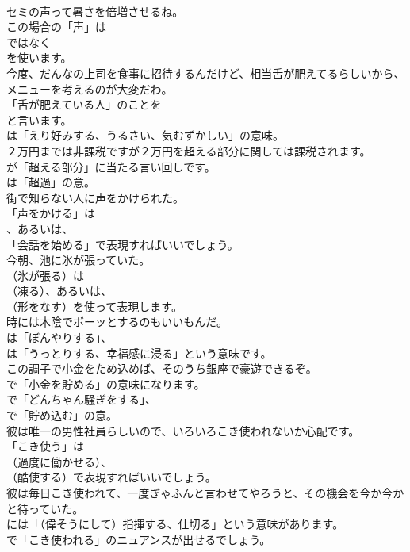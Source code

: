 \documentclass[8pt]{extreport}
\begin{document}
\begin{CJK}{UTF8}{min}
\\	セミの声って暑さを倍増させるね。 
\\	この場合の「声」は
\\	ではなく
\\	を使います。	
\\	今度、だんなの上司を食事に招待するんだけど、相当舌が肥えてるらしいから、メニューを考えるのが大変だわ。 
\\	「舌が肥えている人」のことを
\\	と言います。
\\	は「えり好みする、うるさい、気むずかしい」の意味。	
\\	２万円までは非課税ですが２万円を超える部分に関しては課税されます。 
\\	が「超える部分」に当たる言い回しです。
\\	は「超過」の意。	
\\	街で知らない人に声をかけられた。 
\\	「声をかける」は
\\	、あるいは、
\\	「会話を始める」で表現すればいいでしょう。	
\\	今朝、池に氷が張っていた。 
\\	（氷が張る）は
\\	（凍る）、あるいは、
\\	（形をなす）を使って表現します。	
\\	時には木陰でボーッとするのもいいもんだ。 
\\	は「ぼんやりする」、
\\	は「うっとりする、幸福感に浸る」という意味です。	
\\	この調子で小金をため込めば、そのうち銀座で豪遊できるぞ。 
\\	で「小金を貯める」の意味になります。
\\	で「どんちゃん騒ぎをする」、
\\	で「貯め込む」の意。	
\\	彼は唯一の男性社員らしいので、いろいろこき使われないか心配です。 
\\	「こき使う」は 
\\	（過度に働かせる）、
\\	（酷使する）で表現すればいいでしょう。	
\\	彼は毎日こき使われて、一度ぎゃふんと言わせてやろうと、その機会を今か今かと待っていた。 
\\	には「（偉そうにして）指揮する、仕切る」という意味があります。
\\	で「こき使われる」のニュアンスが出せるでしょう。	

\end{CJK}
\end{document}

